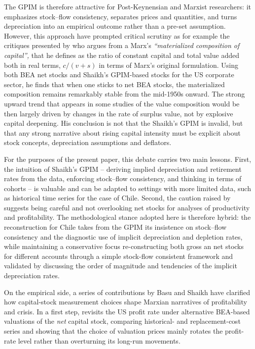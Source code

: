 \documentclass[11pt,a4paper]{article}
\begin{document}
The GPIM is therefore attractive for Post-Keynensian and Marxist researchers: it emphasizes stock--flow consistency, separates prices and quantities, and turns depreciation into an empirical outcome rather than a pre-set assumption. However, this approach have prompted critical scrutiny as for example the critiques presented by \citet{Zarembka2019} who argues from a Marx's \textit{``materialized composition of capital'',} that he defines as the ratio of constant capital and total value added both in real terms, $c/(v+s)$ in terms of Marx's original formulation. Using both BEA net stocks and Shaikh's GPIM-based stocks for the US corporate sector, he finds that when one sticks to net BEA stocks, the materialized composition remains remarkably stable from the mid-1950s onward. The strong upward trend that appears in some studies of the value composition  would be then largely driven by changes in the rate of surplus value, not by explosive capital deepening. His conclusion is not that the Shaikh's GPIM is invalid, but that any strong narrative about rising capital intensity must be explicit about stock concepts, depreciation assumptions and deflators. 

For the purposes of the present paper, this debate carries two main lessons. First, the intuition of Shaikh's GPIM -- deriving implied depreciation and retirement rates from the data, enforcing stock--flow consistency, and thinking in terms of cohorts -- is valuable and can be adapted to settings with more limited data, such as historical time series for the case of Chile. Second, the caution raised by \citet{Zarembka2019} suggests being careful and not overlooking net stocks for analyses of productivity and profitability. The methodological stance adopted here is therefore hybrid: the reconstruction for Chile takes from the GPIM its insistence on stock--flow consistency and the diagnostic use of implicit depreciation and depletion rates, while maintaining a conservative focus re-constructing both gross an net stocks for different accounts through a simple stock-flow consistent framework and validated by discussing the order of magnitude and tendencies of the implicit depreciation rates.

On the empirical side, a series of contributions by Basu and Shaikh have clarified how capital-stock measurement choices shape Marxian narratives of profitability and crisis. In a first step, \citet{Basu2013} revisits the US profit rate under alternative BEA-based valuations of the \emph{net} capital stock, comparing historical- and replacement-cost series and showing that the choice of valuation prices mainly rotates the profit-rate level rather than overturning its long-run movements. 
\end{document}
